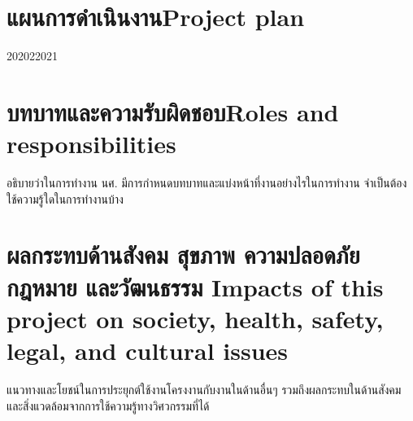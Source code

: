 \section{\ifcpe แผนการดำเนินงาน\else Project plan\fi}

\begin{plan}{6}{2020}{2}{2021}
\end{plan}

\section{\ifcpe บทบาทและความรับผิดชอบ\else Roles and responsibilities\fi}
อธิบายว่าในการทำงาน นศ. มีการกำหนดบทบาทและแบ่งหน้าที่งานอย่างไรในการทำงาน จำเป็นต้องใช้ความรู้ใดในการทำงานบ้าง

\section{\ifcpe%
ผลกระทบด้านสังคม สุขภาพ ความปลอดภัย กฎหมาย และวัฒนธรรม
\else%
Impacts of this project on society, health, safety, legal, and cultural issues
\fi}

แนวทางและโยชน์ในการประยุกต์ใช้งานโครงงานกับงานในด้านอื่นๆ รวมถึงผลกระทบในด้านสังคมและสิ่งแวดล้อมจากการใช้ความรู้ทางวิศวกรรมที่ได้
